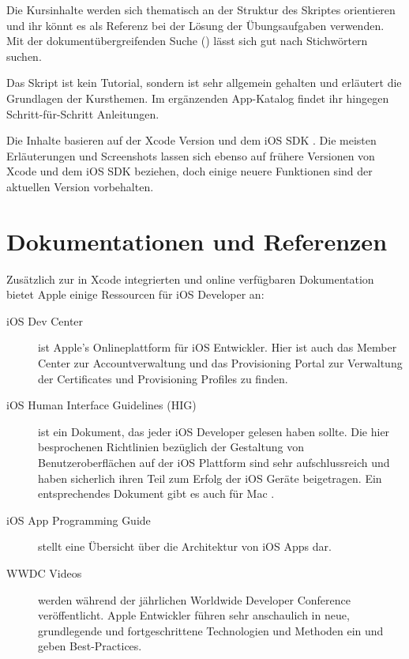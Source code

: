 \documentclass[parskip=half, final]{scrreprt}
\begin{document}
Die Kursinhalte werden sich thematisch an der Struktur des Skriptes orientieren und ihr könnt es als Referenz bei der Lösung der Übungsaufgaben verwenden. Mit der dokumentübergreifenden Suche () lässt sich gut nach Stichwörtern suchen.

Das Skript ist kein Tutorial, sondern ist sehr allgemein gehalten und erläutert die Grundlagen der Kursthemen. Im ergänzenden App-Katalog findet ihr hingegen Schritt-für-Schritt Anleitungen.

Die Inhalte basieren auf der Xcode Version \vxcode{} und dem iOS SDK \vios{}. Die meisten Erläuterungen und Screenshots lassen sich ebenso auf frühere Versionen von Xcode und dem iOS SDK beziehen, doch einige neuere Funktionen sind der aktuellen Version vorbehalten.

\section{Dokumentationen und Referenzen}\label{sec:docs}

Zusätzlich zur in Xcode integrierten und online verfügbaren Dokumentation  bietet Apple einige Ressourcen für iOS Developer an:

\begin{description}
\item[iOS Dev Center]  ist Apple's Onlineplattform für iOS Entwickler. Hier ist auch das Member Center zur Accountverwaltung und das Provisioning Portal zur Verwaltung der Certificates und Provisioning Profiles  zu finden.
\item[iOS Human Interface Guidelines (HIG)]  ist ein Dokument, das jeder iOS Developer gelesen haben sollte. Die hier besprochenen Richtlinien bezüglich der Gestaltung von Benutzeroberflächen auf der iOS Plattform sind sehr aufschlussreich und haben sicherlich ihren Teil zum Erfolg der iOS Geräte beigetragen. Ein entsprechendes Dokument gibt es auch für Mac .
\item[iOS App Programming Guide]  stellt eine Übersicht über die Architektur von iOS Apps dar.
\item[WWDC Videos]  werden während der jährlichen Worldwide Developer Conference veröffentlicht. Apple Entwickler führen sehr anschaulich in neue, grundlegende und fortgeschrittene Technologien und Methoden ein und geben Best-Practices.
\end{description}
\end{document}
